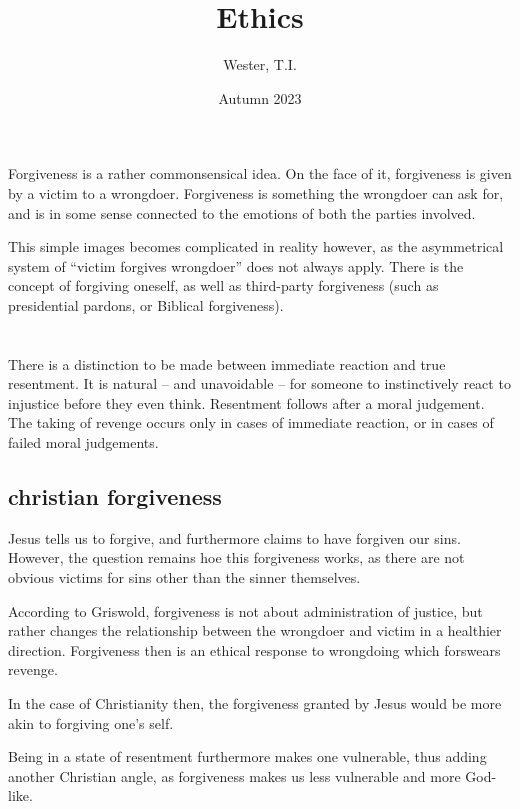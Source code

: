 \documentclass[12pt]{report}
\title{Ethics}
\date{Autumn 2023}
\author{Wester, T.I.}
\begin{document}
\maketitle
\tableofcontents

\chapter{}

Forgiveness is a rather commonsensical idea. On the face of it, forgiveness is
given by a victim to a wrongdoer. Forgiveness is something the wrongdoer can
ask for, and is in some sense connected to the emotions of both the parties
involved.

This simple images becomes complicated in reality however, as the asymmetrical
system of ``victim forgives wrongdoer'' does not always apply. There is the
concept of forgiving oneself, as well as third-party forgiveness (such as
presidential pardons, or Biblical forgiveness).

\chapter{}

There is a distinction to be made between immediate reaction and true
resentment. It is natural -- and unavoidable -- for someone to instinctively
react to injustice before they even think. Resentment follows after a moral
judgement. The taking of revenge occurs only in cases of immediate reaction, or
in cases of failed moral judgements.

\section{christian forgiveness}

Jesus tells us to forgive, and furthermore claims to have forgiven our sins.
However, the question remains hoe this forgiveness works, as there are not
obvious victims for sins other than the sinner themselves.

According to Griswold, forgiveness is not about administration of justice, but
rather changes the relationship between the wrongdoer and victim in a healthier
direction. Forgiveness then is an ethical response to wrongdoing which forswears
revenge.

In the case of Christianity then, the forgiveness granted by Jesus would be more
akin to forgiving one's self.

Being in a state of resentment furthermore makes one vulnerable, thus adding
another Christian angle, as forgiveness makes us less vulnerable and more
God-like.
\end{document}
